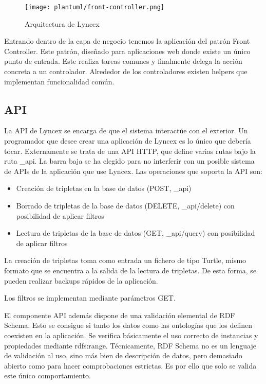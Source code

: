 \documentclass[12pt]{report} %
\begin{document}
\begin{figure}
    \centering
    \texttt{[image: plantuml/front-controller.png]}
    \caption{Arquitectura de Lyncex}
    \label{fig:arquitectura}
\end{figure}

Entrando dentro de la capa de negocio tenemos la aplicación del patrón Front Controller.
Este patrón, diseñado para aplicaciones web donde existe un único punto de entrada. Este realiza tareas comunes y finalmente delega la acción concreta a un controlador. Alrededor de los controladores existen helpers que implementan funcionalidad común.

\subsection{API}

La API de Lyncex se encarga de que el sistema interactúe con el exterior.
Un programador que desee crear una aplicación de Lyncex es lo único que debería tocar.
Externamente se trata de una API HTTP, que define varias rutas bajo la ruta \_api. La barra baja se ha elegido para no interferir con un posible sistema de APIs de la aplicación que use Lyncex.
Las operaciones que soporta la API son:
\begin{itemize}
    \item Creación de tripletas en la base de datos (POST, \_api)
    \item Borrado de tripletas de la base de datos (DELETE, \_api/delete) con posibilidad de aplicar filtros
    \item Lectura de tripletas de la base de datos (GET, \_api/query) con posibilidad de aplicar filtros
\end{itemize}

La creación de tripletas toma como entrada un fichero de tipo Turtle, mismo formato que se encuentra a la salida de la lectura de tripletas.
De esta forma, se pueden realizar backups rápidos de la aplicación.

Los filtros se implementan mediante parámetros GET.

El componente API además dispone de una validación elemental de RDF Schema.
Esto se consigue si tanto los datos como las ontologías que los definen coexisten en la aplicación.
Se verifica básicamente el uso correcto de instancias y propiedades mediante rdfs:range.
Técnicamente, RDF Schema no es un lenguaje de validación al uso, sino más bien de descripción de datos, pero demasiado abierto como para hacer comprobaciones estrictas.
Es por ello que solo se valida este único comportamiento.
\end{document}
